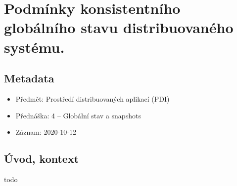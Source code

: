 

\section{Podmínky konsistentního globálního stavu distribuovaného systému.}

\subsection{Metadata}

\begin{itemize}
    \item Předmět: Prostředí distribuovaných aplikací (PDI)
    \item Přednáška: 4 -- Globální stav a snapshots
    \item Záznam: 2020-10-12
\end{itemize}

\subsection{Úvod, kontext}

todo
